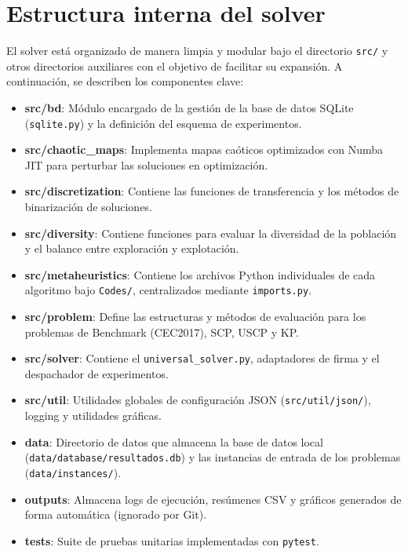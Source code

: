 \section{Estructura interna del solver}

El solver está organizado de manera limpia y modular bajo el directorio \texttt{src/} y otros directorios auxiliares con el objetivo de facilitar su expansión. A continuación, se describen los componentes clave:

\begin{itemize}
    \item \textbf{src/bd}: Módulo encargado de la gestión de la base de datos SQLite (\texttt{sqlite.py}) y la definición del esquema de experimentos.
    \item \textbf{src/chaotic\_maps}: Implementa mapas caóticos optimizados con Numba JIT para perturbar las soluciones en optimización.
    \item \textbf{src/discretization}: Contiene las funciones de transferencia y los métodos de binarización de soluciones.
    \item \textbf{src/diversity}: Contiene funciones para evaluar la diversidad de la población y el balance entre exploración y explotación.
    \item \textbf{src/metaheuristics}: Contiene los archivos Python individuales de cada algoritmo bajo \texttt{Codes/}, centralizados mediante \texttt{imports.py}.
    \item \textbf{src/problem}: Define las estructuras y métodos de evaluación para los problemas de Benchmark (CEC2017), SCP, USCP y KP.
    \item \textbf{src/solver}: Contiene el \texttt{universal\_solver.py}, adaptadores de firma y el despachador de experimentos.
    \item \textbf{src/util}: Utilidades globales de configuración JSON (\texttt{src/util/json/}), logging y utilidades gráficas.
    \item \textbf{data}: Directorio de datos que almacena la base de datos local (\texttt{data/database/resultados.db}) y las instancias de entrada de los problemas (\texttt{data/instances/}).
    \item \textbf{outputs}: Almacena logs de ejecución, resúmenes CSV y gráficos generados de forma automática (ignorado por Git).
    \item \textbf{tests}: Suite de pruebas unitarias implementadas con \texttt{pytest}.
\end{itemize}

